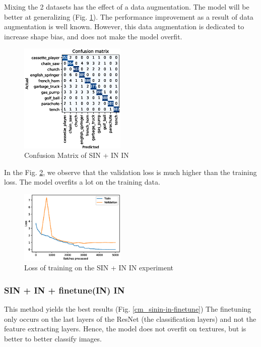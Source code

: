 \documentclass{article}
\begin{document}
Mixing the 2 datasets has the effect of a data augmentation. The model will be better
at generalizing (Fig. \ref{cm_sinin-in}). The performance improvement as a result of data augmentation 
is well known. However, this data augmentation is dedicated to increase shape bias,
and does not make the model overfit.

\begin{figure}[h!]
  \includegraphics[width = 0.45\textwidth]{imgs/sinin/sinin-in_confusion_matrix_0.973.eps}
  \caption{Confusion Matrix of SIN + IN \texorpdfstring{\textrightarrow} .IN}
  \label{cm_sinin-in}
\end{figure}

In the Fig. \ref{loss_sinin}, we observe that the validation loss is much higher than the training
loss. The model overfits a lot on the training data.


\begin{figure}[h!]
  \includegraphics[width = 0.45\textwidth]{imgs/sinin/loss.eps}
  \caption{Loss of training on the SIN + IN \texorpdfstring{\textrightarrow} .IN experiment}
  \label{loss_sinin}
\end{figure}

\subsubsection{SIN + IN + finetune(IN) \texorpdfstring{\textrightarrow} .IN}

This method yields the best results (Fig. \ref{cm_sinin-in-finetune}) The finetuning only occurs
on the last layers of the ResNet (the classification layers) and not the feature extracting layers.
Hence, the model does not overfit on textures, but is better to better classify images.
\end{document}
